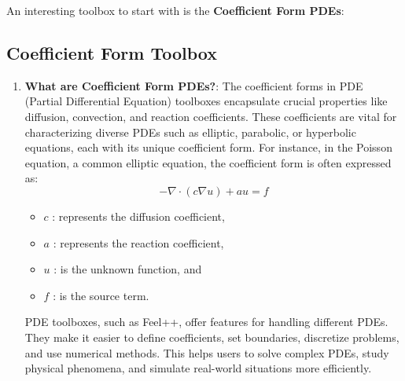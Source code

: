 \documentclass[12pt]{article}
\begin{document}
\begin{enumerate}
An interesting toolbox to start with is the \textbf{Coefficient Form PDEs}:

\subsection{Coefficient Form Toolbox}

\begin{enumerate}
    \item \textbf{What are Coefficient Form PDEs?}: The coefficient forms in PDE (Partial Differential Equation) toolboxes encapsulate crucial properties like diffusion, convection, and reaction coefficients. These coefficients are vital for characterizing diverse PDEs such as elliptic, parabolic, or hyperbolic equations, each with its unique coefficient form.
    For instance, in the Poisson equation, a common elliptic equation, the coefficient form is often expressed as:
    \[
        -\nabla \cdot (c \nabla u) + au = f
    \]

    \begin{itemize}
        \item \(c\) : represents the diffusion coefficient,
        \item \(a\) : represents the reaction coefficient,
        \item \(u\) : is the unknown function, and
        \item \(f\) : is the source term.
    \end{itemize}
    
    PDE toolboxes, such as Feel++, offer features for handling different PDEs. They make it easier to define coefficients, set boundaries, discretize problems, and use numerical methods. This helps users to solve complex PDEs, study physical phenomena, and simulate real-world situations more efficiently.


\end{enumerate}
\end{enumerate}
\end{document}
